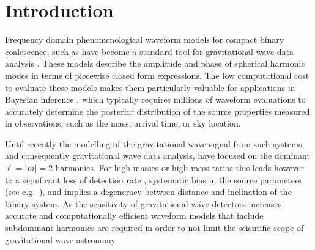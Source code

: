 \documentclass[twocolumn,prd,aps,superscriptaddress,preprintnumbers,tightenlines,showpacs,nofootinbib,eqsecnum,amsfonts,amsmath]{revtex4}
\begin{document}
\section{Introduction}\label{sec:introduction}

Frequency domain phenomenological waveform models for compact binary coalescence, such as \cite{Khan:2015jqa,Hannam:2013oca,Bohe:PPv2,London:2017bcn} have become a standard tool for gravitational wave data analysis \cite{TheLIGOScientific:2016wfe,LIGOScientific:2018mvr}. These models describe the amplitude and phase of spherical harmonic modes in terms of piecewise closed form expressions. The low computational cost to evaluate these models makes them particularly valuable for applications in Bayesian inference \cite{Veitch:2014wba,Ashton:2018jfp}, which typically requires millions of waveform evaluations to accurately determine the posterior distribution of the source properties measured in observations, such as the mass, arrival time, or sky location.

Until recently the modelling of the gravitational wave signal from such systems, and consequently gravitational wave data analysis, have  focused on the dominant $\ell=|m|=2$ harmonics. For high masses or high mass ratios this leads however to a significant loss of detection rate \cite{Varma:2014hm,Varma:2017hm,BustilloHusa:2016}, systematic bias in the source parameters (see e.g.~\cite{Littenberg:2012uj,Varma:2014hm,Bustillo:2015qty,Chatziioannou:2019dsz,Kalaghatgi:2019log,Shaik:2019dym}), and implies a degeneracy between distance and inclination of the binary system.
As the sensitivity of gravitational wave detectors increases, accurate and computationally efficient waveform models that include subdominant harmonics are required in order to not limit the scientific scope of gravitational wave astronomy.
\end{document}
